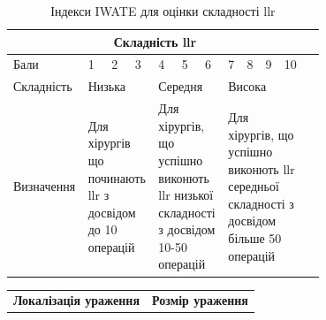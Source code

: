 \begin{refsection}
\begin{table}
\begin{tabular}{ |p{0.15\linewidth} |p{0.05\linewidth} |p{0.05\linewidth}|p{0.05\linewidth}|p{0.05\linewidth}|p{0.05\linewidth}|p{0.05\linewidth}|p{0.05\linewidth}|p{0.05\linewidth}|p{0.05\linewidth}|p{0.05\linewidth}|p{0.05\linewidth}| }
 \hline
 \multicolumn{11}{|c|}{Складність \acrshort{llr}} \\
 \hline
 Бали & 1 & 2 & 3 & 4 & 5 & 6 & 7 & 8 & 9 & 10 \\
 \hline
 Складність   & \multicolumn{3}{p{0.15\linewidth}|}{Низька} & \multicolumn{3}{p{0.15\linewidth}|}{Середня} & \multicolumn{4}{p{0.20\linewidth}|}{Висока} \\
 \hline
 Визначення   & \multicolumn{3}{p{0.20\linewidth}|}{Для хірургів що починають \acrshort{llr} з досвідом до 10 операцій} & \multicolumn{3}{p{0.20\linewidth}|}{Для хірургів, що успішно виконють \acrshort{llr} низької складності з досвідом 10-50 операцій } & \multicolumn{4}{p{0.25\linewidth}|}{Для хірургів, що успішно виконють \acrshort{llr} середньої складності з досвідом більше 50 операцій } \\
 \hline
\end{tabular}

\caption{\label{table:iwate}Індекси IWATE для оцінки складності \acrshort{llr} }
\end{table}





\begin{table}
\begin{tabular}[t]{ |p{}| p{}|  }
\hline
    \textbf{Локалізація ураження} & \textbf{Розмір ураження} \\


\end{tabular}
\end{table}
\end{refsection}
